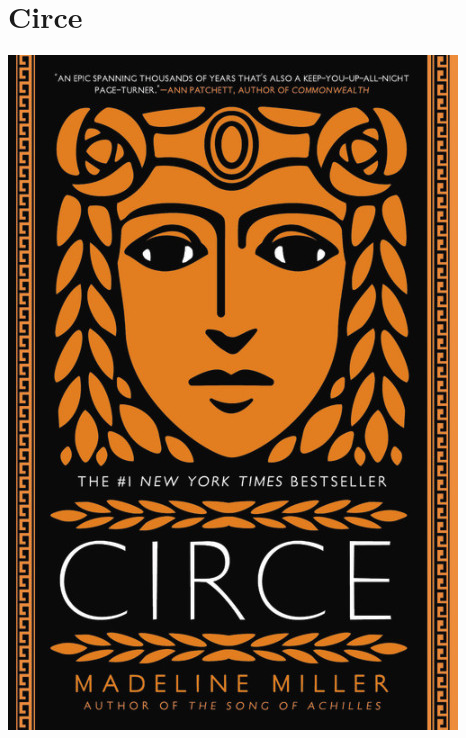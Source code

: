 \documentclass{tufte-handout}
\makeatletter
\newcommand{\varcaption}[2][0pt]{%
  \gsetlength{\@tufte@caption@vertical@offset}{-#1}%
  \gdef\@tufte@stored@varcaption{#2}%
}
\gdef\@tufte@stored@varcaption{} %
\makeatother
\begin{document}
\section*{Circe}
\begin{marginfigure}[\baselineskip]
   \includegraphics[width=\linewidth]{images/circe.jpg}
   \varcaption{\href{https://www.littlebrown.com/titles/madeline-miller/circe/9780316556323/}{Publisher Link}, \href{https://www.amazon.com/Circe-Madeline-Miller/dp/0316556327/}{Amazon Link}}
\end{marginfigure}
\end{document}
